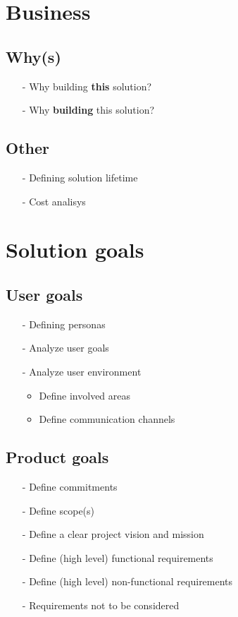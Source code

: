 \documentclass[
	fontsize=10pt, %
	twoside=false, %
	secnumdepth=1, %
]{kaobook}
\begin{document}
\mainmatter %

\chapter{Business}

	\section{Why(s)}
		\begin{itemize}
			\item[-] Why building \textbf{this} solution?
			\item[-] Why \textbf{building} this solution?
		\end{itemize}

		\section{Other}
		\begin{itemize}
			\item[-] Defining solution lifetime
			\item[-] Cost analisys
		\end{itemize}

\chapter{Solution goals}

\section{User goals}
	\begin{itemize}
		\item[-] Defining personas
		\item[-] Analyze user goals
		\item[-] Analyze user environment
		\begin{itemize}
			\item Define involved areas
			\item Define communication channels
		\end{itemize}
	\end{itemize}

\section{Product goals}
	\begin{itemize}
		\item[-] Define commitments
		\item[-] Define scope(s)
		\item[-] Define a clear project vision and mission
		\item[-] Define (high level) functional requirements
		\item[-] Define (high level) non-functional requirements
		\item[-] Requirements not to be considered
	\end{itemize}
\end{document}
